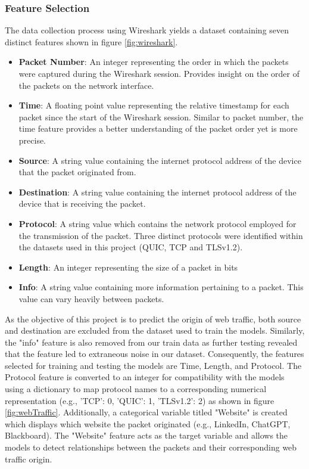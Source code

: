 \documentclass[10pt,sigconf,letterpaper,nonacm]{acmart}
\begin{document}
\subsubsection{Feature Selection}
The data collection process using Wireshark yields a dataset containing seven distinct features shown in figure \ref{fig:wireshark}. 
\begin{itemize}
  \item \textbf{Packet Number}: An integer representing the order in which the packets were captured during the Wireshark session. Provides insight on the order of the packets on the network interface. 
  \item \textbf{Time}: A floating point value representing the relative timestamp for each packet since the start of the Wireshark session. Similar to packet number, the time feature provides a better understanding of the packet order yet is more precise.
  \item \textbf{Source}: A string value containing the internet protocol address of the device that the packet originated from. 
  \item \textbf{Destination}: A string value containing the internet protocol address of the device that is receiving the packet. 
  \item \textbf{Protocol}: A string value which contains the network protocol employed for the transmission of the packet. Three distinct protocols were identified within the datasets used in this project (QUIC, TCP and TLSv1.2).
  \item \textbf{Length}: An integer representing the size of a packet in bits 
  \item \textbf{Info}: A string value containing more information pertaining to a packet. This value can vary heavily between packets.
\end{itemize} 
As the objective of this project is to predict the origin of web traffic, both source and destination are excluded from the dataset used to train the models. 
Similarly, the "info" feature is also removed from our train data as further testing revealed that the feature led to extraneous noise in our dataset. 
Consequently, the features selected for training and testing the models are Time, Length, and Protocol. The Protocol feature is converted to an integer for compatibility with 
the models using a dictionary to map protocol names to a corresponding numerical representation (e.g., 'TCP': 0, 'QUIC': 1, 'TLSv1.2': 2) as shown in figure \ref{fig:webTraffic}.  Additionally, a categorical variable titled "Website" 
is created which displays which website the packet originated (e.g., LinkedIn, ChatGPT, Blackboard). The "Website" feature acts as the target variable and allows 
the models to detect relationships between the packets and their corresponding web traffic origin. 
\end{document}
